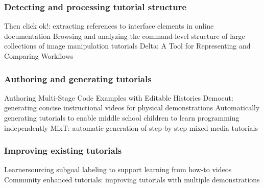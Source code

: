 \subsubsection{Detecting and processing tutorial structure}
Then click ok!: extracting references to interface elements in online documentation
Browsing and analyzing the command-level structure of large collections of image manipulation tutorials
Delta: A Tool for Representing and Comparing Workflows

\subsubsection{Authoring and generating tutorials}
Authoring Multi-Stage Code Examples with Editable Histories
Democut: generating concise instructional videos for physical demonstrations
Automatically generating tutorials to enable middle school children to learn programming independently
MixT: automatic generation of step-by-step mixed media tutorials

\subsubsection{Improving existing tutorials}
Learnersourcing subgoal labeling to support learning from how-to videos
Community enhanced tutorials: improving tutorials with multiple demonstrations
